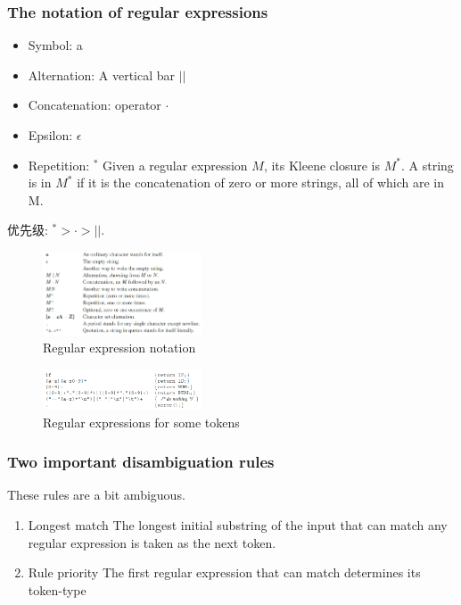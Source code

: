 \subsubsection{The notation of regular expressions}
\begin{itemize}
    \item Symbol: a
    \item Alternation: A vertical bar $||$
    \item Concatenation: operator $\cdot$
    \item Epsilon: $\epsilon$
    \item Repetition: ${}^*$
    \subitem Given a regular expression $M$, its Kleene closure is $M^*$.
    \subitem A string is in $M^*$ if it is the concatenation of zero or more strings, all of which are in M.
\end{itemize}

优先级: ${}^*> \cdot > ||$.

\begin{figure}[!htb]
    \centering
    \includegraphics[width=0.42\textwidth]{pic/CP2/Regular expression notation}
    \caption{Regular expression notation}
\end{figure}

\begin{figure}[!htb]
    \centering
    \includegraphics[width=0.42\textwidth]{pic/CP2/Regular expressions for some tokens}
    \caption{Regular expressions for some tokens}
\end{figure}

\subsubsection{Two important disambiguation rules}
These rules are a bit ambiguous.

\begin{enumerate}
    \item Longest match
    \subitem The longest initial substring of the input that can match any regular expression is taken as the next token.
    \item Rule priority
    \subitem The first regular expression that can match determines its token-type
\end{enumerate}